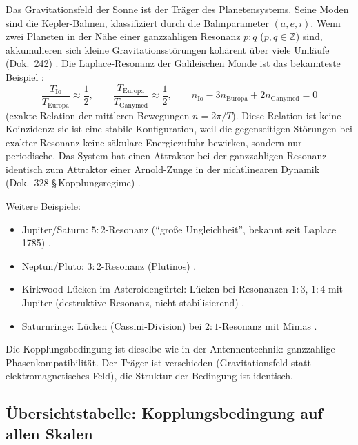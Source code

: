 Das Gravitationsfeld der Sonne ist der Träger des Planetensystems.
Seine Moden sind die Kepler-Bahnen, klassifiziert durch die
Bahnparameter $(a, e, i)$. Wenn zwei Planeten in der Nähe einer
ganzzahligen Resonanz $p:q$ ($p, q \in \mathbb{Z}$) sind, akkumulieren
sich kleine Gravitationsstörungen kohärent über viele Umläufe
(Dok.~242) \cite{PascherDok242,Murray1999}. Die Laplace-Resonanz der Galileischen Monde ist das
bekannteste Beispiel \cite{Murray1999,Peale1979}:
\[
  \frac{T_\mathrm{Io}}{T_\mathrm{Europa}} \approx \frac{1}{2},
  \qquad
  \frac{T_\mathrm{Europa}}{T_\mathrm{Ganymed}} \approx \frac{1}{2},
  \qquad
  n_\mathrm{Io} - 3n_\mathrm{Europa} + 2n_\mathrm{Ganymed} = 0
\]
(exakte Relation der mittleren Bewegungen $n = 2\pi/T$). Diese
Relation ist keine Koinzidenz: sie ist eine stabile Konfiguration,
weil die gegenseitigen Störungen bei exakter Resonanz keine
säkulare Energiezufuhr bewirken, sondern nur periodische. Das System
hat einen Attraktor bei der ganzzahligen Resonanz --- identisch
zum Attraktor einer Arnold-Zunge in der nichtlinearen Dynamik
(Dok.~328 §\,Kopplungsregime) \KM.

Weitere Beispiele:
\begin{itemize}[nosep]
  \item Jupiter/Saturn: $5:2$-Resonanz (``große Ungleichheit'',
    bekannt seit Laplace 1785) \QM.
  \item Neptun/Pluto: $3:2$-Resonanz (Plutinos) \QM.
  \item Kirkwood-Lücken im Asteroidengürtel: Lücken bei
    Resonanzen $1:3$, $1:4$ mit Jupiter (destruktive Resonanz,
    nicht stabilisierend) \QM.
  \item Saturnringe: Lücken (Cassini-Division) bei $2:1$-Resonanz
    mit Mimas \QM.
\end{itemize}

Die Kopplungsbedingung ist dieselbe wie in der Antennentechnik: ganzzahlige
Phasenkompatibilität. Der Träger ist verschieden (Gravitationsfeld statt
elektromagnetisches Feld), die Struktur der Bedingung ist identisch.

\subsection*{Übersichtstabelle: Kopplungsbedingung auf allen Skalen}

